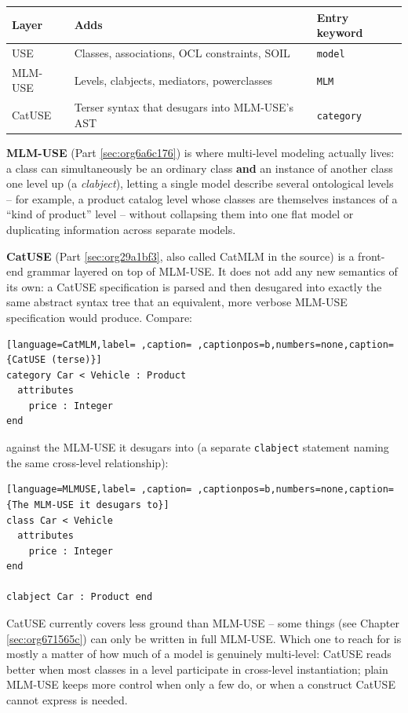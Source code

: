 \documentclass[11pt,twoside,a4paper]{book}
\begin{document}
\begin{center}
\begin{tabular}{lp{7cm}l}
Layer & Adds & Entry keyword\\[0pt]
\hline
USE & Classes, associations, OCL constraints, SOIL & \texttt{model}\\[0pt]
MLM-USE & Levels, clabjects, mediators, powerclasses & \texttt{MLM}\\[0pt]
CatUSE & Terser syntax that desugars into MLM-USE's AST & \texttt{category}\\[0pt]
\end{tabular}
\end{center}

\textbf{MLM-USE} (Part \ref{sec:org6a6c176}) is where multi-level modeling
actually lives: a class can simultaneously be an ordinary class \textbf{and}
an instance of another class one level up (a \emph{clabject}), letting a
single model describe several ontological levels -- for example, a
product catalog level whose classes are themselves instances of a
``kind of product'' level -- without collapsing them into one flat
model or duplicating information across separate models.

\textbf{CatUSE} (Part \ref{sec:org29a1bf3}, also called CatMLM in the source) is a
front-end grammar layered on top of MLM-USE. It does not add any new
semantics of its own: a CatUSE specification is parsed and then
desugared into exactly the same abstract syntax tree that an
equivalent, more verbose MLM-USE specification would produce. Compare:

\begin{lstlisting}[language=CatMLM,label= ,caption= ,captionpos=b,numbers=none,caption={CatUSE (terse)}]
category Car < Vehicle : Product
  attributes
    price : Integer
end
\end{lstlisting}

against the MLM-USE it desugars into (a separate \texttt{clabject} statement
naming the same cross-level relationship):

\begin{lstlisting}[language=MLMUSE,label= ,caption= ,captionpos=b,numbers=none,caption={The MLM-USE it desugars to}]
class Car < Vehicle
  attributes
    price : Integer
end

clabject Car : Product end
\end{lstlisting}

CatUSE currently covers less ground than MLM-USE -- some things (see
Chapter \ref{sec:org671565c}) can only be written in full
MLM-USE. Which one to reach for is mostly a matter of how much of a
model is genuinely multi-level: CatUSE reads better when most classes
in a level participate in cross-level instantiation; plain MLM-USE
keeps more control when only a few do, or when a construct CatUSE
cannot express is needed.
\end{document}
